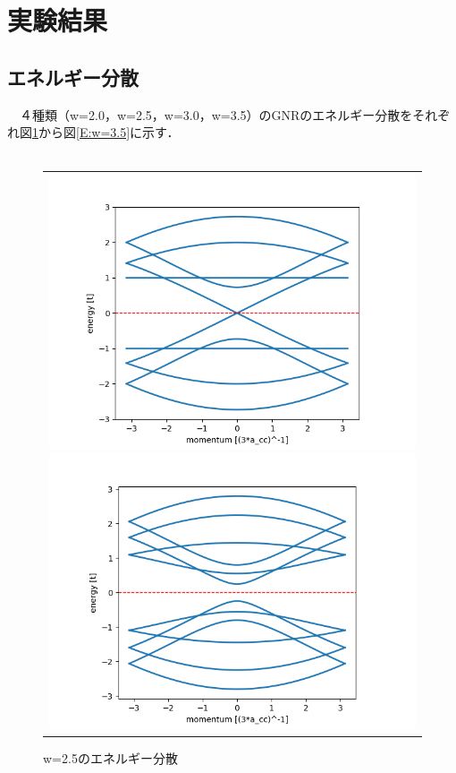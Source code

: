 \section{実験結果}
\subsection{エネルギー分散}
　４種類（w=2.0，w=2.5，w=3.0，w=3.5）のGNRのエネルギー分散をそれぞれ図\ref{E:w=2.0}から図\ref{E:w=3.5}に示す．\\
\\
\begin{figure}[htpb]
  \centering

  \begin{tabular}{c}
    \begin{minipage}{0.50\hsize}
    \centering
    \includegraphics[keepaspectratio, scale=0.55]{./data/w2/w2-band_2.png}
    \caption{w=2.0のエネルギー分散}
    \label{E:w=2.0}
    \end{minipage}

    \begin{minipage}{0.50\hsize}
    \centering
    \includegraphics[keepaspectratio, scale=0.55]{./data/w2_5/w2_5-band_2.png}
    \caption{w=2.5のエネルギー分散}
    \end{minipage}


\end{tabular}
\end{figure}
